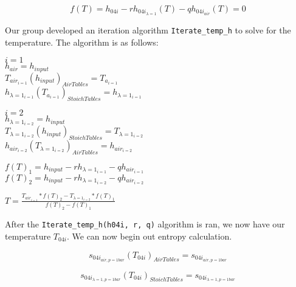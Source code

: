 \documentclass[titlepage]{article}
\begin{document}
    \begin{equation}
        f(T) = h_{04i} - r h_{04i_{\lambda=1}}(T) - q h_{04i_{air}}(T) = 0
    \end{equation}

    Our group developed an iteration algorithm \verb|Iterate_temp_h| to solve for the temperature. The algorithm is as follows:

    \begin{center}
        $i = 1$ \\
        $h_{air} = h_{input}$ \\
        $T_{air_{i=1}}(h_{input})_{Air Tables} = T_{a_{i=1}}$ \\
        $h_{\lambda= 1_{i=1}}(T_{a_{i=1}})_{Stoich Tables} = h_{\lambda=1_{i=1}}$ \\

        \vspace*{0.5cm}

        $i=2$ \\
        $h_{\lambda=1_{i=2}} = h_{input}$ \\
        $T_{\lambda=1_{i=2}}(h_{input})_{Stoich Tables} = T_{\lambda=1_{i=2}}$ \\
        $h_{air_{i=2}}(T_{\lambda=1_{i=2}})_{Air Tables} = h_{air_{i=2}}$ \\

        \vspace*{0.5cm}

        $f(T)_{1} = h_{input} - r h_{\lambda=1_{i=1}} - q h_{air_{i=1}}$ \\
        $f(T)_{2} = h_{input} - r h_{\lambda=1_{i=2}} - q h_{air_{i=2}}$ \\

        \vspace*{0.5cm}

        $T = \frac{T_{air_{i=1}} * f(T)_{2} - T_{\lambda=1_{i=2}} * f(T)_{1}}{f(T)_{2} - f(T)_{1}}$ \\
    \end{center}

    After the \verb|Iterate_temp_h(h04i, r, q)| algorithm is ran, we now have our temperature $T_{04i}$. We can now begin out 
    entropy calculation.
    
    \begin{equation}
        s_{04i_{air, p= 1 bar}}(T_{04i})_{Air Tables} = s_{04i_{air, p=1 bar}}
    \end{equation} 

    \begin{equation}
        s_{04i_{\lambda=1, p= 1 bar}}(T_{04i})_{Stoich  Tables} = s_{04i_{\lambda=1, p = 1 bar}}
    \end{equation}
\end{document}
